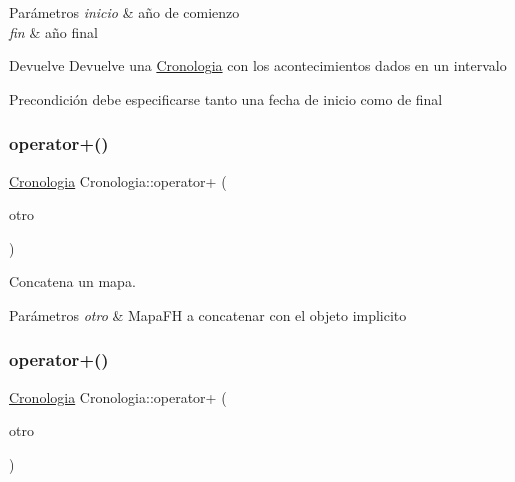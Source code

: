 \begin{DoxyParams}{Parámetros}
{\em inicio} & año de comienzo \\
\hline
{\em fin} & año final \\
\hline
\end{DoxyParams}
\begin{DoxyReturn}{Devuelve}
Devuelve una \hyperlink{classCronologia}{Cronologia} con los acontecimientos dados en un intervalo 
\end{DoxyReturn}
\begin{DoxyPrecond}{Precondición}
debe especificarse tanto una fecha de inicio como de final 
\end{DoxyPrecond}
\mbox{\label{classCronologia_a5113eae269dbf9bdbb3637142b02d267}} 
\subsubsection{\texorpdfstring{operator+()}{operator+()}\hspace{0.1cm}{\footnotesize\ttfamily [1/2]}}
{\footnotesize\ttfamily \hyperlink{classCronologia}{Cronologia} Cronologia\+::operator+ (\begin{DoxyParamCaption}\item[{const Mapa\+FH \&}]{otro }\end{DoxyParamCaption})}



Concatena un mapa. 


\begin{DoxyParams}{Parámetros}
{\em otro} & Mapa\+FH a concatenar con el objeto implicito \\
\hline
\end{DoxyParams}
\mbox{\label{classCronologia_ab17768986b01369038b5b3852ad21fef}} 
\subsubsection{\texorpdfstring{operator+()}{operator+()}\hspace{0.1cm}{\footnotesize\ttfamily [2/2]}}
{\footnotesize\ttfamily \hyperlink{classCronologia}{Cronologia} Cronologia\+::operator+ (\begin{DoxyParamCaption}\item[{const \hyperlink{classFechaHistorica}{Fecha\+Historica} \&}]{otro }\end{DoxyParamCaption})}




